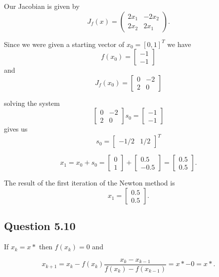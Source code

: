 \documentclass[12pt,a4paper]{report}
\begin{document}
Our Jacobian is given by $$J_f(x) = \left(\begin{smallmatrix} 2x_1 & -2x_2 \\ 2x_2 & 2x_1 \end{smallmatrix} \right).$$

Since we were given a starting vector of $x_0 = [0, 1]^T$ we have
$$f(x_0) = \left[ \begin{smallmatrix} -1 \\ -1 \end{smallmatrix} \right]$$
and
$$J_f(x_0) = \left[ \begin{smallmatrix} 0 & -2 \\ 2 & 0 \end{smallmatrix} \right]$$

solving the system $$\left[ \begin{smallmatrix} 0 & -2 \\ 2 & 0 \end{smallmatrix} \right] s_0 =
\left[ \begin{smallmatrix} -1 \\ -1 \end{smallmatrix} \right]$$
gives us $$s_0 = \left[ \begin{smallmatrix} -1/2 & 1/2 \end{smallmatrix} \right]^T$$

$$x_1 = x_0 + s_0 = \left[\begin{smallmatrix}0\\1\end{smallmatrix}\right] +
\left[\begin{smallmatrix}0.5\\-0.5\end{smallmatrix}\right] =
\left[\begin{smallmatrix}0.5\\0.5\end{smallmatrix}\right].$$

The result of the first iteration of the Newton method is
$$ x_1 = \left[\begin{smallmatrix}0.5\\0.5\end{smallmatrix}\right].$$

\subsection*{Question 5.10}
If $x_k = x*$ then $f(x_k) = 0$ and

$$x_{k+1} = x_k - f(x_k) \frac{x_k - x_{k-1}}{f(x_k) - f(x_{k-1})} = x* - 0 = x*.$$
\end{document}
